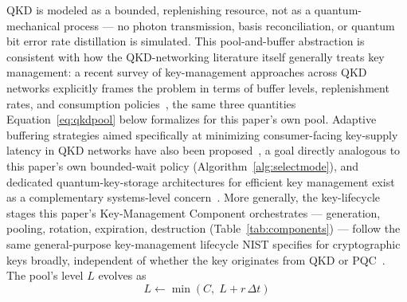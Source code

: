 \documentclass[journal]{IEEEtran}
\begin{document}
QKD is modeled as a bounded, replenishing resource, not as a quantum-mechanical process --- no photon transmission, basis reconciliation, or quantum bit error rate distillation is simulated. This pool-and-buffer abstraction is consistent with how the QKD-networking literature itself generally treats key management: a recent survey of key-management approaches across QKD networks explicitly frames the problem in terms of buffer levels, replenishment rates, and consumption policies~\cite{dervisevic2024qkdkeymgmt}, the same three quantities Equation~\eqref{eq:qkdpool} below formalizes for this paper's own pool. Adaptive buffering strategies aimed specifically at minimizing consumer-facing key-supply latency in QKD networks have also been proposed~\cite{quiks2026adaptivebuffer}, a goal directly analogous to this paper's own bounded-wait policy (Algorithm~\ref{alg:selectmode}), and dedicated quantum-key-storage architectures for efficient key management exist as a complementary systems-level concern~\cite{quantumkeystorage2024}. More generally, the key-lifecycle stages this paper's Key-Management Component orchestrates --- generation, pooling, rotation, expiration, destruction (Table~\ref{tab:components}) --- follow the same general-purpose key-management lifecycle NIST specifies for cryptographic keys broadly, independent of whether the key originates from QKD or PQC~\cite{nist2020sp80057}. The pool's level $L$ evolves as
\begin{equation}
L \leftarrow \min(C,\; L + r\,\Delta t)
\label{eq:qkdpool}
\end{equation}
\end{document}
